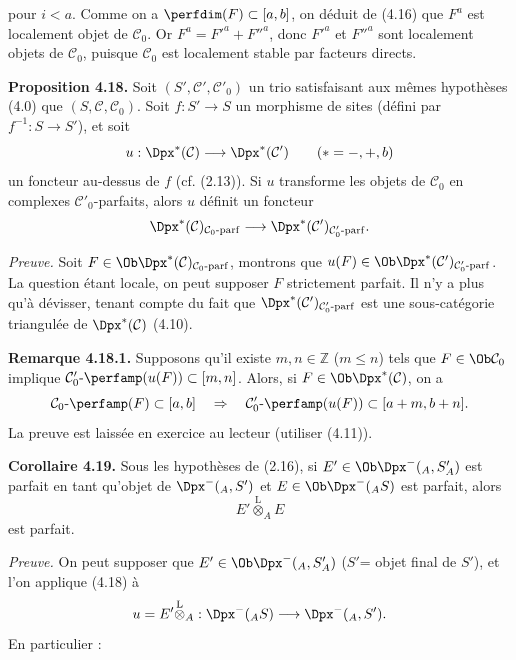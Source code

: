pour \(i<a\). Comme on a \(\perfdim(F)\subset[a,b]\), on déduit de (4.16) que \(F^a\) est localement objet de \(\mathcal C_0\). Or \(F^a=F'^a+F''^a\), donc \(F'^a\) et \(F''^a\) sont localement objets de \(\mathcal C_0\), puisque \(\mathcal C_0\) est localement stable par facteurs directs.

\textbf{Proposition 4.18.} Soit \((S',\mathcal C',\mathcal C'_0)\) un trio satisfaisant aux mêmes hypothèses (4.0) que \((S,\mathcal C,\mathcal C_0)\). Soit \(f:S'\to S\) un morphisme de sites (défini par \(f^{-1}:S\to S'\)), et soit
\[
  u:\Dpx^*(\mathcal C)\longrightarrow \Dpx^*(\mathcal C')\qquad (*=-,+,b)
\]
un foncteur au-dessus de \(f\) (cf. (2.13)). Si \(u\) transforme les objets de \(\mathcal C_0\) en complexes \(\mathcal C'_0\)-parfaits, alors \(u\) définit un foncteur
\[
  \Dpx^*(\mathcal C)_{\mathcal C_0\text{-}\mathrm{parf}}
  \longrightarrow
  \Dpx^*(\mathcal C')_{\mathcal C'_0\text{-}\mathrm{parf}}.
\]

\emph{Preuve.} Soit \(F\in\Ob\Dpx^*(\mathcal C)_{\mathcal C_0\text{-}\mathrm{parf}}\), montrons que \(u(F)\in\Ob\Dpx^*(\mathcal C')_{\mathcal C'_0\text{-}\mathrm{parf}}\). La question étant locale, on peut supposer \(F\) strictement parfait. Il n'y a plus qu'à dévisser, tenant compte du fait que \(\Dpx^*(\mathcal C')_{\mathcal C'_0\text{-}\mathrm{parf}}\) est une sous-catégorie triangulée de \(\Dpx^*(\mathcal C)\) (4.10).

\textbf{Remarque 4.18.1.} Supposons qu'il existe \(m,n\in\mathbb Z\) (\(m\leq n\)) tels que \(F\in\Ob\mathcal C_0\) implique \(\mathcal C'_0\text{-}\perfamp(u(F))\subset[m,n]\). Alors, si \(F\in\Ob\Dpx^*(\mathcal C)\), on a
\[
  \mathcal C_0\text{-}\perfamp(F)
  \subset[a,b]
  \quad\Rightarrow\quad
  \mathcal C'_0\text{-}\perfamp(u(F))
  \subset[a+m,b+n].
\]
La preuve est laissée en exercice au lecteur (utiliser (4.11)).

\textbf{Corollaire 4.19.} Sous les hypothèses de (2.16), si \(E'\in\Ob\Dpx^-({}_A, S'_A)\) est parfait en tant qu'objet de \(\Dpx^-({}_A, S')\) et \(E\in\Ob\Dpx^-({}_A S)\) est parfait, alors
\[
  E'\overset{\mathrm L}{\otimes}_A E
\]
est parfait.

\emph{Preuve.} On peut supposer que \(E'\in\Ob\Dpx^-({}_A, S'_A)\) (\(S'\)= objet final de \(S'\)), et l'on applique (4.18) à
\[
  u=E'\overset{\mathrm L}{\otimes}_A:
  \Dpx^-({}_A S)\longrightarrow \Dpx^-({}_A, S').
\]
En particulier :

